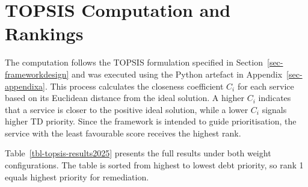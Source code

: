 \documentclass[
  12pt,
  letterpaper,
  12pt,
  oneside,
  english,
  onehalfspacing,
  headsepline]{MastersDoctoralThesis}
\begin{document}
\section{TOPSIS Computation and Rankings}\label{sec-topsis-results}

The computation follows the TOPSIS formulation specified in
Section~\ref{sec-frameworkdesign} and was executed using the Python
artefact in Appendix~\ref{sec-appendixa}. This process calculates the
closeness coefficient \(C_i\) for each service based on its Euclidean
distance from the ideal solution. A higher \(C_i\) indicates that a
service is closer to the positive ideal solution, while a lower \(C_i\)
signals higher TD priority. Since the framework is intended to guide
prioritisation, the service with the least favourable score receives the
highest rank.

Table~\ref{tbl-topsis-results2025} presents the full results under both
weight configurations. The table is sorted from highest to lowest debt
priority, so rank 1 equals highest priority for remediation.
\end{document}
